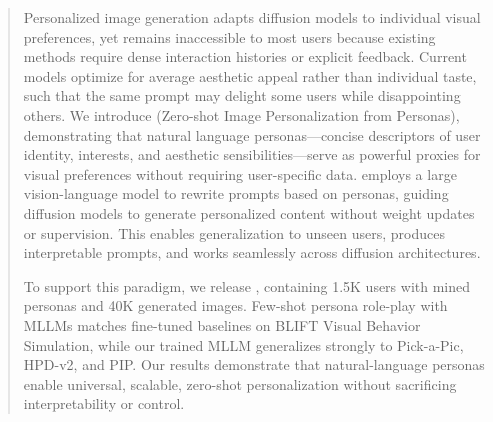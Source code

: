 \begin{abstract}
Personalized image generation adapts diffusion models to individual visual preferences, yet remains inaccessible to most users because existing methods require dense interaction histories or explicit feedback. Current models optimize for average aesthetic appeal rather than individual taste, such that the same prompt may delight some users while disappointing others. We introduce \zipp (Zero-shot Image Personalization from Personas), demonstrating that natural language personas—concise descriptors of user identity, interests, and aesthetic sensibilities—serve as powerful proxies for visual preferences without requiring user-specific data. \zipp employs a large vision-language model to rewrite prompts based on personas, guiding diffusion models to generate personalized content without weight updates or supervision. This enables generalization to unseen users, produces interpretable prompts, and works seamlessly across diffusion architectures.

To support this paradigm, we release \zipbench, containing 1.5K users with mined personas and 40K generated images. Few-shot persona role-play with MLLMs matches fine-tuned baselines on BLIFT Visual Behavior Simulation, while our trained MLLM generalizes strongly to Pick-a-Pic, HPD-v2, and PIP. Our results demonstrate that natural-language personas enable universal, scalable, zero-shot personalization without sacrificing interpretability or control.

\end{abstract}






